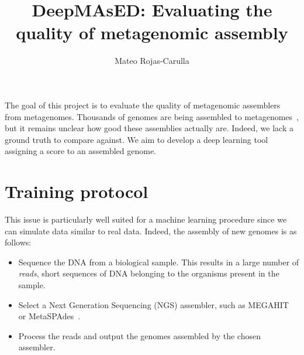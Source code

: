 \documentclass{scrartcl}
\title{\LARGE DeepMAsED: Evaluating the quality of metagenomic assembly}
\author{\large Mateo Rojas-Carulla
}
\date{}
\begin{document}
\maketitle

The goal of this project is to evaluate the quality of metagenomic assemblers from metagenomes. 
Thousands of genomes are being assembled to metagenomes~\citep{pasolli2019extensive}, but it remains unclear 
how good these assemblies actually are. Indeed, we lack a ground truth to compare against. We aim to develop a 
deep learning tool assigning a score to an assembled genome.

\section{Training protocol}

This issue is particularly well suited for a machine learning procedure since we can simulate data similar to real data. Indeed, 
the assembly of new genomes is as follows:
\begin{itemize}
  \item Sequence the DNA from a biological sample. This results in a large number of \emph{reads}, short sequences of DNA belonging 
    to the organisms present in the sample. 
  \item Select a Next Generation Sequencing (NGS) assembler, such as MEGAHIT~\citep{li2015megahit} or MetaSPAdes~\citep{nurk2017metaspades}. 
  \item Process the reads and output the genomes assembled by the chosen assembler. 
\end{itemize}


\end{document}
